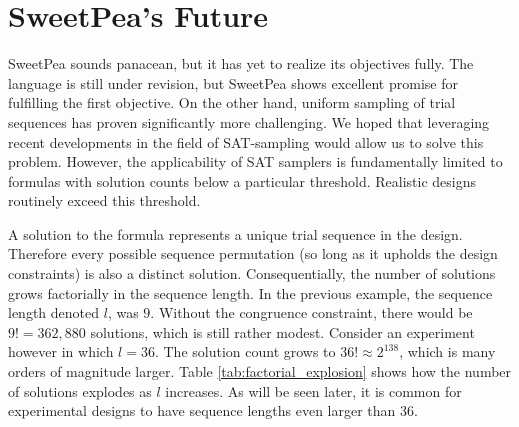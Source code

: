 \section{SweetPea's Future}

SweetPea sounds panacean, but it has yet to realize its objectives fully. The language is still under revision, but SweetPea shows excellent promise for fulfilling the first objective. On the other hand, uniform sampling of trial sequences has proven significantly more challenging. We hoped that leveraging recent developments in the field of SAT-sampling would allow us to solve this problem. However, the applicability of SAT samplers is fundamentally limited to formulas with solution counts below a particular threshold. Realistic designs routinely exceed this threshold.

A solution to the formula represents a unique trial sequence in the design. Therefore every possible sequence permutation (so long as it upholds the design constraints) is also a distinct solution. Consequentially, the number of solutions grows factorially in the sequence length. In the previous example, the sequence length denoted $l$, was $9$. Without the congruence constraint, there would be $9! = 362,880$ solutions, which is still rather modest. Consider an experiment however in which $l = 36$. The solution count grows to $36! \approx 2^{138}$, which is many orders of magnitude larger. Table \ref{tab:factorial_explosion} shows how the number of solutions explodes as $l$ increases. As will be seen later, it is common for experimental designs to have sequence lengths even larger than 36.

